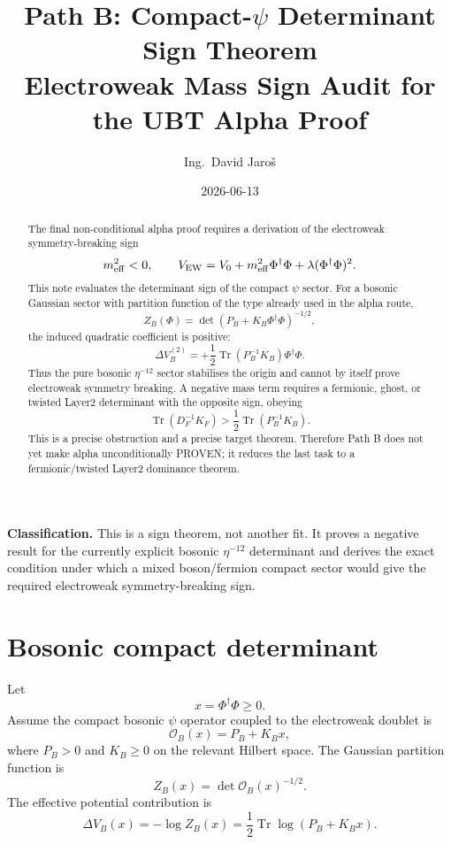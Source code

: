 \documentclass[12pt,a4paper]{article}
\title{Path B: Compact-$\psi$ Determinant Sign Theorem\\
       \large Electroweak Mass Sign Audit for the UBT Alpha Proof}
\author{Ing.\ David Jaro\v{s}}
\date{2026-06-13}
\begin{document}
\maketitle
\fi

\begin{abstract}
The final non-conditional alpha proof requires a derivation of the electroweak
symmetry-breaking sign
\[
  m_{\rm eff}^2<0,
  \qquad
  V_{\rm EW}=V_0+m_{\rm eff}^2\Phi^\dagger\Phi+
  \lambda(\Phi^\dagger\Phi)^2.
\]
This note evaluates the determinant sign of the compact $\psi$ sector.  For a
bosonic Gaussian sector with partition function of the type already used in the
alpha route,
\[
  Z_B(\Phi)=\det(P_B+K_B\Phi^\dagger\Phi)^{-1/2},
\]
the induced quadratic coefficient is positive:
\[
  \Delta V_B^{(2)}=+
  \frac12\operatorname{Tr}(P_B^{-1}K_B)\Phi^\dagger\Phi.
\]
Thus the pure bosonic $\eta^{-12}$ sector stabilises the origin and cannot by
itself prove electroweak symmetry breaking.  A negative mass term requires a
fermionic, ghost, or twisted Layer2 determinant with the opposite sign, obeying
\[
  \operatorname{Tr}(D_F^{-1}K_F)
  >
  \frac12\operatorname{Tr}(P_B^{-1}K_B).
\]
This is a precise obstruction and a precise target theorem.  Therefore Path B
does not yet make alpha unconditionally PROVEN; it reduces the last task to a
fermionic/twisted Layer2 dominance theorem.
\end{abstract}

\begin{statusbox}
\textbf{Classification.} This is a sign theorem, not another fit.  It proves a
negative result for the currently explicit bosonic $\eta^{-12}$ determinant and
derives the exact condition under which a mixed boson/fermion compact sector
would give the required electroweak symmetry-breaking sign.
\end{statusbox}

\section{Bosonic compact determinant}

Let
\[
  x=\Phi^\dagger\Phi\ge0.
\]
Assume the compact bosonic $\psi$ operator coupled to the electroweak doublet is
\[
  \mathcal O_B(x)=P_B+K_Bx,
\]
where $P_B>0$ and $K_B\ge0$ on the relevant Hilbert space.  The Gaussian
partition function is
\[
  Z_B(x)=\det \mathcal O_B(x)^{-1/2}.
\]
The effective potential contribution is
\[
  \Delta V_B(x)=-\log Z_B(x)
  =\frac12\operatorname{Tr}\log(P_B+K_Bx).
\]
\end{document}
